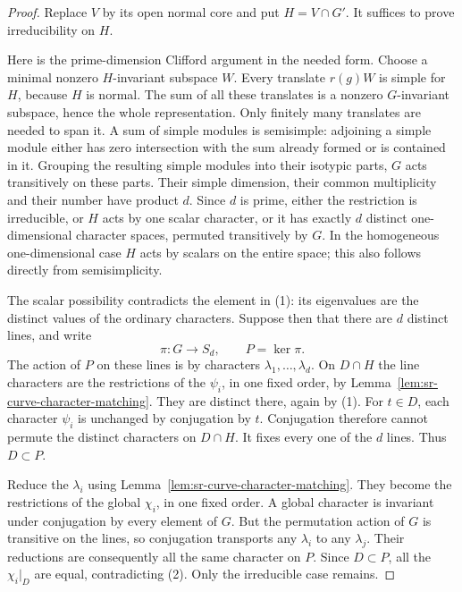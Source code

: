 \begin{proof}
Replace \(V\) by its open normal core and put \(H=V\cap G'\).
It suffices to prove irreducibility on \(H\).

Here is the prime-dimension Clifford argument in the needed form.
Choose a minimal nonzero \(H\)-invariant subspace \(W\).
Every translate \(r(g)W\) is simple for \(H\), because \(H\)
is normal.  The sum of all these translates is a nonzero
\(G\)-invariant subspace, hence the whole representation.
Only finitely many translates are needed to span it.
A sum of simple modules is semisimple: adjoining a simple
module either has zero intersection with the sum already
formed or is contained in it.
Grouping the resulting simple modules into their isotypic
parts, \(G\) acts transitively on these parts.
Their simple dimension, their common multiplicity and
their number have product \(d\).
Since \(d\) is prime, either the restriction is irreducible,
or \(H\) acts by one scalar character, or it has exactly
\(d\) distinct one-dimensional character spaces, permuted
transitively by \(G\).
In the homogeneous one-dimensional case \(H\) acts by scalars
on the entire space; this also follows directly from
semisimplicity.

The scalar possibility contradicts the element in (1):
its eigenvalues are the distinct values of the ordinary
characters.  Suppose then that there are \(d\) distinct
lines, and write
\[
        \pi:G\to S_d,\qquad P=\ker\pi .
\]
The action of \(P\) on these lines is by characters
\(\lambda_1,\ldots,\lambda_d\).
On \(D\cap H\) the line characters are the restrictions of
the \(\psi_i\), in one fixed order, by
Lemma~\ref{lem:sr-curve-character-matching}.
They are distinct there, again by (1).
For \(t\in D\), each character \(\psi_i\) is unchanged by
conjugation by \(t\).
Conjugation therefore cannot permute the distinct characters
on \(D\cap H\).  It fixes every one of the \(d\) lines.
Thus \(D\subset P\).

Reduce the \(\lambda_i\) using
Lemma~\ref{lem:sr-curve-character-matching}.
They become the restrictions of the global \(\chi_i\), in
one fixed order.  A global character is invariant under
conjugation by every element of \(G\).
But the permutation action of \(G\) is transitive on the
lines, so conjugation transports any \(\lambda_i\) to any
\(\lambda_j\).
Their reductions are consequently all the same character
on \(P\).
Since \(D\subset P\), all the \(\chi_i|_D\) are equal,
contradicting (2).
Only the irreducible case remains.
\end{proof}

